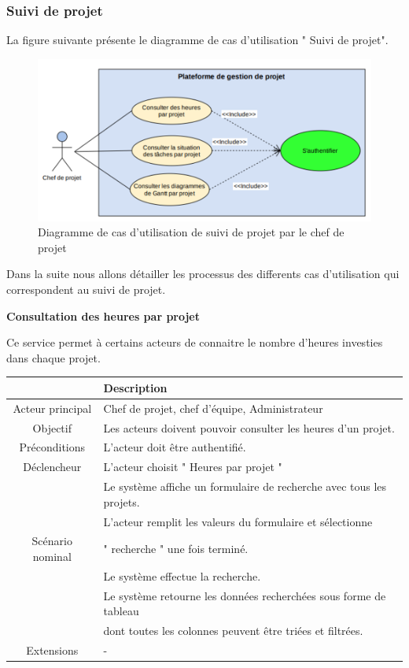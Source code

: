 \subsubsection{	Suivi de projet}
\hspace{4mm}La figure suivante présente le diagramme de cas d'utilisation " Suivi de projet".
\begin{figure}[h]
    \centering
    \includegraphics[scale=0.8]{figures/anis13.png}
    \caption{Diagramme de cas d'utilisation de suivi de projet par le chef de projet}
    \label{fig:cas_gestp_chefp}
\end{figure}
\par Dans la suite nous allons détailler les processus des differents cas d'utilisation qui correspondent au suivi de projet.
\par \textbf{  	Consultation des heures par projet	}
\par Ce service permet à certains acteurs de connaitre le nombre d'heures investies dans chaque projet.
\begin{center}
\begin{tabular}{|c|l|}
\hline 
&\textbf { Description }\\\hline 
    Acteur principal & Chef de projet, chef d’équipe, Administrateur \\\hline 
    Objectif&Les acteurs doivent pouvoir consulter les heures d’un projet.\\\hline
    Préconditions&L’acteur doit être authentifié.  \\\hline 
    Déclencheur&L’acteur choisit " Heures par projet "\\\hline 
    &Le système affiche un formulaire de recherche avec tous les projets.   \\
    &L’acteur remplit les valeurs du formulaire et sélectionne    \\
    Scénario nominal&" recherche " une fois terminé. \\
    &Le système effectue la recherche.    \\
    & Le système retourne les données recherchées sous forme de tableau  \\
    &dont toutes les colonnes peuvent être triées et filtrées.  \\\hline
    Extensions&                    - \\\hline
\end{tabular}
\label{desc_cree_proj}
\end{center}
